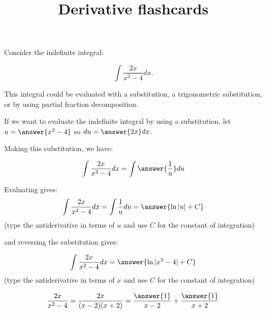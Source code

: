 \documentclass{ximera}
\title{Derivative flashcards}
\begin{document}
\begin{exercise}
Consider the indefinite integral:
 
\[
\int \frac{2x}{x^2-4} dx.
\]
 
This integral could be evaluated with a substitution, a trigonometric substitution, or by using partial fraction decomposition.
 
If we want to evaluate the indefinite integral by using a substitution, let $u= \answer{x^2-4}$ so $du = \answer{2x} dx$.
 
\begin{exercise}
Making this substitution, we have:
 
\[
\int \frac{2x}{x^2-4} dx = \int \answer{\frac{1}{u}} du
\]
\begin{exercise}
Evaluating gives:
\[
\int \frac{2x}{x^2-4} dx = \int\frac{1}{u} du = \answer{\ln|u|+C}
\]
(type the antiderivative in terms of $u$ and use $C$ for the constant of integration)
 
and reversing the substitution gives:
 
\[
\int \frac{2x}{x^2-4} dx = \answer{\ln|x^2-4|+C}
\]
(type the antiderivative in terms of $x$ and use $C$ for the constant of integration)
\end{exercise}
\end{exercise}
 
\[
\frac{2x}{x^2-4} = \frac{2x}{(x-2)(x+2)} = \frac{\answer{1}}{x-2}+\frac{\answer{1}}{x+2}
\]
  
\end{exercise}
\end{document}
